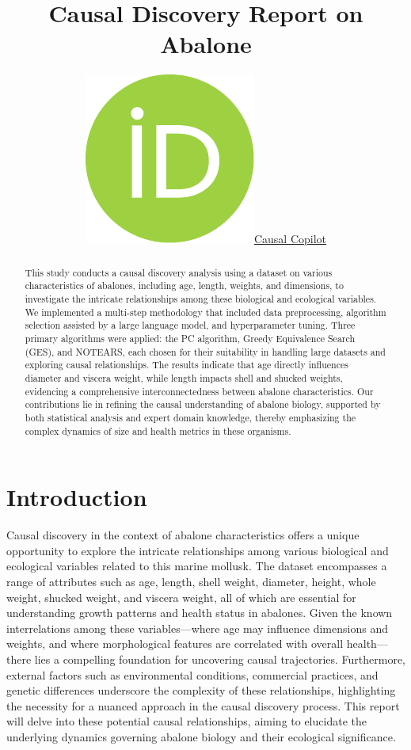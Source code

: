 \documentclass{article}
\title{Causal Discovery Report on Abalone}
\author{ \href{https://orcid.org/0000-0000-0000-0000}{\includegraphics[scale=0.06]{postprocess/context/orcid.pdf}\hspace{1mm}Causal Copilot}}
\begin{document}
\maketitle

\begin{abstract}
This study conducts a causal discovery analysis using a dataset on various characteristics of abalones, including age, length, weights, and dimensions, to investigate the intricate relationships among these biological and ecological variables. We implemented a multi-step methodology that included data preprocessing, algorithm selection assisted by a large language model, and hyperparameter tuning. Three primary algorithms were applied: the PC algorithm, Greedy Equivalence Search (GES), and NOTEARS, each chosen for their suitability in handling large datasets and exploring causal relationships. The results indicate that age directly influences diameter and viscera weight, while length impacts shell and shucked weights, evidencing a comprehensive interconnectedness between abalone characteristics. Our contributions lie in refining the causal understanding of abalone biology, supported by both statistical analysis and expert domain knowledge, thereby emphasizing the complex dynamics of size and health metrics in these organisms.
\end{abstract}


\raggedbottom
\section{Introduction}
Causal discovery in the context of abalone characteristics offers a unique opportunity to explore the intricate relationships among various biological and ecological variables related to this marine mollusk. The dataset encompasses a range of attributes such as age, length, shell weight, diameter, height, whole weight, shucked weight, and viscera weight, all of which are essential for understanding growth patterns and health status in abalones. Given the known interrelations among these variables—where age may influence dimensions and weights, and where morphological features are correlated with overall health—there lies a compelling foundation for uncovering causal trajectories. Furthermore, external factors such as environmental conditions, commercial practices, and genetic differences underscore the complexity of these relationships, highlighting the necessity for a nuanced approach in the causal discovery process. This report will delve into these potential causal relationships, aiming to elucidate the underlying dynamics governing abalone biology and their ecological significance.
\end{document}
